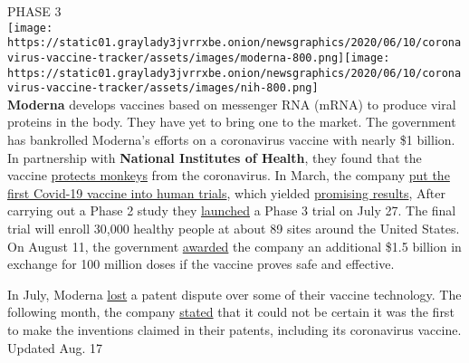 PHASE 3\\
\texttt{[image: https://static01.graylady3jvrrxbe.onion/newsgraphics/2020/06/10/coronavirus-vaccine-tracker/assets/images/moderna-800.png]}\texttt{[image: https://static01.graylady3jvrrxbe.onion/newsgraphics/2020/06/10/coronavirus-vaccine-tracker/assets/images/nih-800.png]}\\
\textbf{Moderna} develops vaccines based on messenger RNA (mRNA) to
produce viral proteins in the body. They have yet to bring one to the
market. The government has bankrolled Moderna's efforts on a coronavirus
vaccine with nearly \$1 billion. In partnership with \textbf{National
Institutes of Health}, they found that the vaccine
\href{https://www.nytimes3xbfgragh.onion/2020/07/28/health/coronavirus-moderna-vaccine-monkeys.html}{protects
monkeys} from the coronavirus. In March, the company
\href{https://www.nytimes3xbfgragh.onion/2020/03/16/health/coronavirus-vaccine.html}{put
the first Covid-19 vaccine into human trials}, which yielded
\href{https://www.nytimes3xbfgragh.onion/2020/07/14/world/coronavirus-update.html\#link-751c8321}{promising
results}, After carrying out a Phase 2 study they
\href{https://www.nytimes3xbfgragh.onion/2020/07/27/world/coronavirus-covid-19.html\#link-6509720d}{launched}
a Phase 3 trial on July 27. The final trial will enroll 30,000 healthy
people at about 89 sites around the United States. On August 11, the
government
\href{https://www.businesswire.com/news/home/20200811005852/en/Moderna-Announces-Supply-Agreement-U.S.-Government-Initial}{awarded}
the company an additional \$1.5 billion in exchange for 100 million
doses if the vaccine proves safe and effective.

In July, Moderna
\href{https://www.nytimes3xbfgragh.onion/reuters/2020/08/11/us/11reuters-health-coronavirus-moderna.html?searchResultPosition=1}{lost}
a patent dispute over some of their vaccine technology. The following
month, the company
\href{https://www.axios.com/moderna-coronavirus-vaccine-sec-disclosure-c8c491d1-0395-4c9d-8bf4-792246c6aa34.html}{stated}
that it could not be certain it was the first to make the inventions
claimed in their patents, including its coronavirus vaccine.\\
Updated Aug. 17

